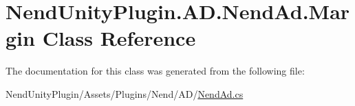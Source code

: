\hypertarget{class_nend_unity_plugin_1_1_a_d_1_1_nend_ad_1_1_margin}{}\section{Nend\+Unity\+Plugin.\+A\+D.\+Nend\+Ad.\+Margin Class Reference}
\label{class_nend_unity_plugin_1_1_a_d_1_1_nend_ad_1_1_margin}


The documentation for this class was generated from the following file\+:\begin{DoxyCompactItemize}
\item 
Nend\+Unity\+Plugin/\+Assets/\+Plugins/\+Nend/\+A\+D/\hyperlink{_nend_ad_8cs}{Nend\+Ad.\+cs}\end{DoxyCompactItemize}

